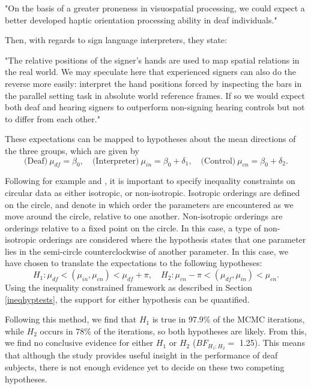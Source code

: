 \begin{displayquote}
"On the basis of a greater proneness in visuospatial processing, we could expect a better developed haptic orientation processing ability in deaf individuals."
\end{displayquote}

Then, with regards to sign language interpreters, they state:

\begin{displayquote}
"The relative positions of the signer's hands are used to map spatial relations in the real world. We may speculate here that experienced signers can also do the reverse more easily: interpret the hand positions forced by inspecting the bars in the parallel setting task in absolute world reference frames. If so we would expect both deaf and hearing signers to outperform non-signing hearing controls but not to differ from each other."
\end{displayquote}

These expectations can be mapped to hypotheses about the mean directions of the three groups, which are given by \[  \text{(Deaf)} ~ \mu_{df} = \beta_0, \quad \text{(Interpreter)} ~ \mu_{in} =  \beta_0 + \delta_1, \quad \text{(Control)} ~ \mu_{cn} = \beta_0 + \delta_2.\]

Following for example \citet{rueda2009estimation} and \citet{baayen2014evaluating}, it is important to specify inequality constraints on circular data as either isotropic, or non-isotropic. Isotropic orderings are defined on the circle, and denote in which order the parameters are encountered as we move around the circle, relative to one another. Non-isotropic orderings are orderings relative to a fixed point on the circle. In this case, a type of non-isotropic orderings are considered where the hypothesis states that one parameter lies in the semi-circle counterclockwise of another parameter. In this case, we have chosen to translate the expectations to the following hypotheses:
\begin{equation}
H_1 : \mu_{df} < (\mu_{in}, \mu_{cn}) < \mu_{df} + \pi, \quad H_2 :  \mu_{cn} - \pi < (\mu_{df}, \mu_{in}) < \mu_{cn}.
\end{equation}
Using the inequality constrained framework as described in Section \ref{ineqhyptests}, the support for either hypothesis can be quantified.



Following this method, we find that \( H_1 \) is true in 97.9\% of the MCMC iterations, while \( H_2 \)  occurs in 78\% of the iterations, so both hypotheses are likely. From this, we find no conclusive evidence for either \( H_1 \) or \( H_2 \) (\( BF_{H_1:H_2} =\) 1.25). This means that although the study provides useful insight in the performance of deaf subjects, there is not enough evidence yet to decide on these two competing hypotheses.


